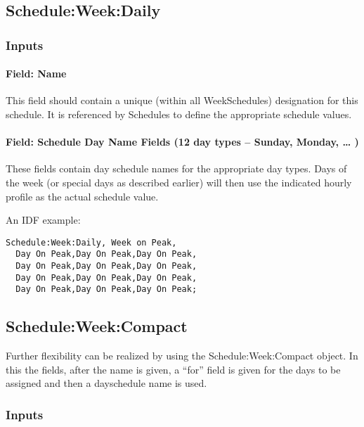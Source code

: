 \subsection{Schedule:Week:Daily}\label{scheduleweekdaily}

\subsubsection{Inputs}\label{inputs-4-029}

\paragraph{Field: Name}\label{field-name-4-025}

This field should contain a unique (within all WeekSchedules) designation for this schedule. It is referenced by Schedules to define the appropriate schedule values.

\paragraph{Field: Schedule Day Name Fields (12 day types -- Sunday, Monday, \ldots{} )}\label{field-schedule-day-name-fields-12-day-types-sunday-monday}

These fields contain day schedule names for the appropriate day types. Days of the week (or special days as described earlier) will then use the indicated hourly profile as the actual schedule value.

An IDF example:

\begin{lstlisting}
Schedule:Week:Daily, Week on Peak,
  Day On Peak,Day On Peak,Day On Peak,
  Day On Peak,Day On Peak,Day On Peak,
  Day On Peak,Day On Peak,Day On Peak,
  Day On Peak,Day On Peak,Day On Peak;
\end{lstlisting}

\subsection{Schedule:Week:Compact}\label{scheduleweekcompact}

Further flexibility can be realized by using the Schedule:Week:Compact object. In this the fields, after the name is given, a ``for'' field is given for the days to be assigned and then a dayschedule name is used.

\subsubsection{Inputs}\label{inputs-5-026}


